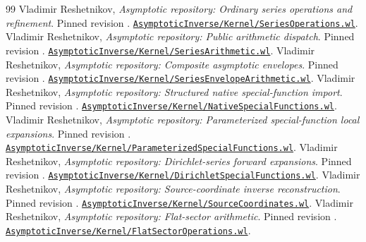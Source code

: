 \begin{thebibliography}{99}
 Vladimir Reshetnikov, \emph{Asymptotic repository: Ordinary series operations and refinement}. Pinned revision . \href{https://github.com/VladimirReshetnikov/Asymptotic/blob/921387e5ba1239bfda96e63e64e89bf63d9c41e6/AsymptoticInverse/Kernel/SeriesOperations.wl}{\nolinkurl{AsymptoticInverse/Kernel/SeriesOperations.wl}}.
 Vladimir Reshetnikov, \emph{Asymptotic repository: Public arithmetic dispatch}. Pinned revision . \href{https://github.com/VladimirReshetnikov/Asymptotic/blob/921387e5ba1239bfda96e63e64e89bf63d9c41e6/AsymptoticInverse/Kernel/SeriesArithmetic.wl}{\nolinkurl{AsymptoticInverse/Kernel/SeriesArithmetic.wl}}.
 Vladimir Reshetnikov, \emph{Asymptotic repository: Composite asymptotic envelopes}. Pinned revision . \href{https://github.com/VladimirReshetnikov/Asymptotic/blob/921387e5ba1239bfda96e63e64e89bf63d9c41e6/AsymptoticInverse/Kernel/SeriesEnvelopeArithmetic.wl}{\nolinkurl{AsymptoticInverse/Kernel/SeriesEnvelopeArithmetic.wl}}.
 Vladimir Reshetnikov, \emph{Asymptotic repository: Structured native special-function import}. Pinned revision . \href{https://github.com/VladimirReshetnikov/Asymptotic/blob/921387e5ba1239bfda96e63e64e89bf63d9c41e6/AsymptoticInverse/Kernel/NativeSpecialFunctions.wl}{\nolinkurl{AsymptoticInverse/Kernel/NativeSpecialFunctions.wl}}.
 Vladimir Reshetnikov, \emph{Asymptotic repository: Parameterized special-function local expansions}. Pinned revision . \href{https://github.com/VladimirReshetnikov/Asymptotic/blob/921387e5ba1239bfda96e63e64e89bf63d9c41e6/AsymptoticInverse/Kernel/ParameterizedSpecialFunctions.wl}{\nolinkurl{AsymptoticInverse/Kernel/ParameterizedSpecialFunctions.wl}}.
 Vladimir Reshetnikov, \emph{Asymptotic repository: Dirichlet-series forward expansions}. Pinned revision . \href{https://github.com/VladimirReshetnikov/Asymptotic/blob/921387e5ba1239bfda96e63e64e89bf63d9c41e6/AsymptoticInverse/Kernel/DirichletSpecialFunctions.wl}{\nolinkurl{AsymptoticInverse/Kernel/DirichletSpecialFunctions.wl}}.
 Vladimir Reshetnikov, \emph{Asymptotic repository: Source-coordinate inverse reconstruction}. Pinned revision . \href{https://github.com/VladimirReshetnikov/Asymptotic/blob/921387e5ba1239bfda96e63e64e89bf63d9c41e6/AsymptoticInverse/Kernel/SourceCoordinates.wl}{\nolinkurl{AsymptoticInverse/Kernel/SourceCoordinates.wl}}.
 Vladimir Reshetnikov, \emph{Asymptotic repository: Flat-sector arithmetic}. Pinned revision . \href{https://github.com/VladimirReshetnikov/Asymptotic/blob/921387e5ba1239bfda96e63e64e89bf63d9c41e6/AsymptoticInverse/Kernel/FlatSectorOperations.wl}{\nolinkurl{AsymptoticInverse/Kernel/FlatSectorOperations.wl}}.

\end{thebibliography}
